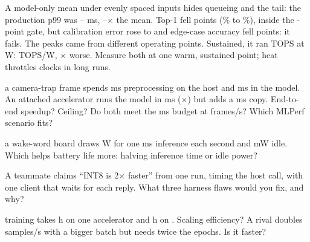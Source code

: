 \documentclass{studysheet}
\begin{document}
\begin{rightcol}
%
  {A model-only mean under evenly spaced inputs hides queueing and the tail: the production p99 was
   -- ms, --$\times$ the mean.}{}
%
  {Top-1 fell  points (\% to \%), inside the -point gate, but
   calibration error rose  to  and edge-case accuracy fell  points: it fails.}{}
%
  {The peaks came from different operating points. Sustained, it ran  TOPS at  W:
    TOPS/W, $\times$ worse. Measure both at one warm, sustained point;
   heat throttles clocks in long runs.}{}

\vspace{2pt}
\begin{qs}
\item \assumed{} a camera-trap frame spends  ms preprocessing on the host and  ms in the
  model. An attached accelerator runs the model in  ms ($\times$) but adds a  ms
  copy. End-to-end speedup? Ceiling? Do both meet the  ms budget at  frames/s? Which MLPerf scenario fits?
\item \assumed{} a wake-word board draws  W for one  ms inference each second and
   mW idle. Which helps battery life more: halving inference time or idle power?
\item A teammate claims ``INT8 is 2$\times$ faster'' from one run, timing the host call, with one client that
  waits for each reply. What three harness flaws would you fix, and why?
\item \assumed{} training takes  h on one accelerator and  h on . Scaling
  efficiency? A rival doubles samples/s with a bigger batch but needs twice the epochs. Is it faster?
\end{qs}
\end{rightcol}
\end{document}
